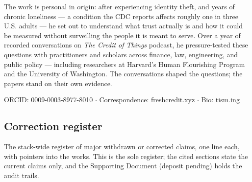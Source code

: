 \documentclass[11pt]{article}
\begin{document}
The work is personal in origin: after experiencing identity theft, and years of
chronic loneliness --- a condition the CDC reports affects roughly one in three
U.S. adults --- he set out to understand what trust actually is and how it could
be measured without surveilling the people it is meant to serve. Over a year of
recorded conversations on \emph{The Credit of Things} podcast, he
pressure-tested these questions with practitioners and scholars across finance,
law, engineering, and public policy --- including researchers at Harvard's Human
Flourishing Program and the University of Washington. The conversations shaped
the questions; the papers stand on their own evidence.

{\sloppy ORCID: 0009-0003-8977-8010 $\cdot$ Correspondence:
freshcredit.xyz $\cdot$ Bio: tism.ing\par}

\subsection*{Correction register}

The stack-wide register of major withdrawn or corrected claims, one line each,
with pointers into the works. This is the sole register; the cited sections state the current claims only, and the Supporting Document (deposit pending) holds the audit trails.
\end{document}
